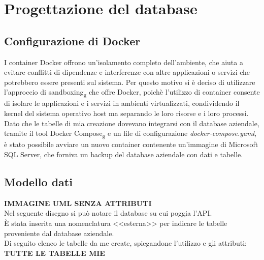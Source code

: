 \section{Progettazione del database}
\subsection{Configurazione di Docker}
I container Docker offrono un'isolamento completo dell'ambiente, che aiuta a evitare conflitti di dipendenze e interferenze con altre applicazioni o servizi che potrebbero essere presenti sul sistema. Per questo motivo si è deciso di utilizzare l'approccio di sandboxing\textsubscript{g} che offre Docker, poichè l'utilizzo di container consente di isolare le applicazioni e i servizi in ambienti virtualizzati, condividendo il kernel del sistema operativo host ma separando le loro risorse e i loro processi.\\
Dato che le tabelle di mia creazione dovevano integrarsi con il database aziendale, tramite il tool Docker Compose\textsubscript{g} e un file di configurazione \textit{docker-compose.yaml}, è stato possibile avviare un nuovo container contenente un'immagine di Microsoft SQL Server, che forniva un backup del database aziendale con dati e tabelle.\\

\subsection{Modello dati}
\textbf{IMMAGINE UML SENZA ATTRIBUTI}\\

\noindent Nel seguente disegno si può notare il database su cui poggia l'API.\\
È stata inserita una nomenclatura <<esterna>> per indicare le tabelle proveniente dal database aziendale.\\
Di seguito elenco le tabelle da me create, spiegandone l'utilizzo e gli attributi:\\

\noindent \textbf{TUTTE LE TABELLE MIE}\\

